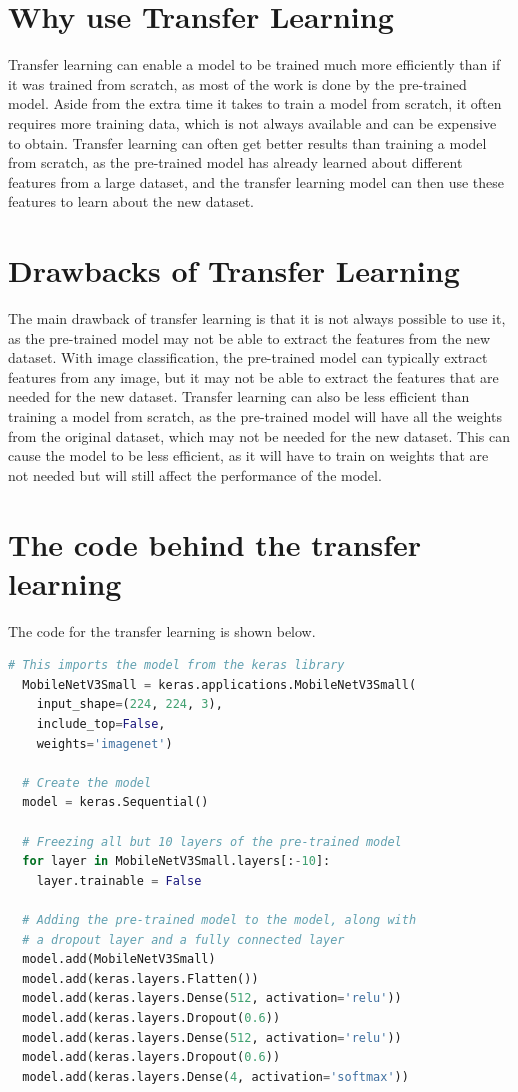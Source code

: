 \documentclass[]{final_report}
\begin{document}
\section{Why use Transfer Learning}
Transfer learning can enable a model to be trained much more efficiently than if it was trained from scratch, as most of the work is done by the pre-trained model.
Aside from the extra time it takes to train a model from scratch, it often requires more training data, which is not always available and can be expensive to obtain.
Transfer learning can often get better results than training a model from scratch, as the pre-trained model has already learned about different features from a large dataset,
and the transfer learning model can then use these features to learn about the new dataset.

\section{Drawbacks of Transfer Learning}
The main drawback of transfer learning is that it is not always possible to use it,
as the pre-trained model may not be able to extract the features from the new dataset.
With image classification, the pre-trained model can typically extract features from any image, but it may not be able to extract the features that are needed for the new dataset.
Transfer learning can also be less efficient than training a model from scratch, 
as the pre-trained model will have all the weights from the original dataset, which may not be needed for the new dataset.
This can cause the model to be less efficient, as it will have to train on weights that are not 
needed but will still affect the performance of the model.

\pagebreak
\section{The code behind the transfer learning}
The code for the transfer learning is shown below.

\begin{lstlisting}[language=Python]
  # This imports the model from the keras library
  MobileNetV3Small = keras.applications.MobileNetV3Small(
    input_shape=(224, 224, 3),
    include_top=False, 
    weights='imagenet')

  # Create the model
  model = keras.Sequential()

  # Freezing all but 10 layers of the pre-trained model
  for layer in MobileNetV3Small.layers[:-10]:
    layer.trainable = False

  # Adding the pre-trained model to the model, along with 
  # a dropout layer and a fully connected layer
  model.add(MobileNetV3Small)
  model.add(keras.layers.Flatten())
  model.add(keras.layers.Dense(512, activation='relu'))
  model.add(keras.layers.Dropout(0.6))
  model.add(keras.layers.Dense(512, activation='relu'))
  model.add(keras.layers.Dropout(0.6))
  model.add(keras.layers.Dense(4, activation='softmax'))
\end{lstlisting}
\end{document}
